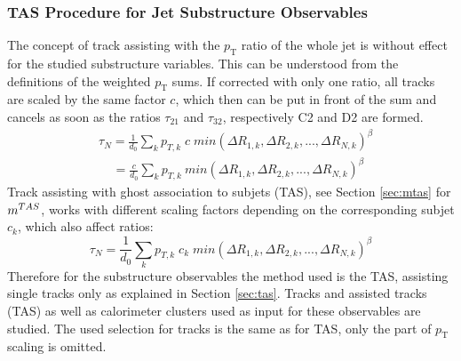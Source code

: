 \subsubsection{TAS Procedure for Jet Substructure Observables}
The concept of track assisting with the $p_{\mathrm{T}}$ ratio of the whole jet is without effect for the studied substructure variables. This can be understood from the definitions of the weighted $p_{\mathrm{T}}$ sums. If corrected with only one ratio, all tracks are scaled by the same factor $c$, which then can be put in front of the sum and cancels as soon as the ratios $\tau_{21}$ and $\tau_{32}$, respectively C2 and D2 are formed.
\begin{equation}
\begin{aligned}
 & \tau_N ={} \frac{1}{d_0}\sum_k p_{T,k} \; c \; min(\Delta R_{1,k},\Delta R_{2,k},...,\Delta R_{N,k})^{\beta} \\
 & \; \; \; \;  ={} \frac{c}{d_0}\sum_k p_{T,k}\:min(\Delta R_{1,k},\Delta R_{2,k},...,\Delta R_{N,k})^{\beta}
\end{aligned}
\end{equation}
Track assisting with ghost association to subjets (TAS), see Section \ref{sec:mtas} for $m^{TAS}$, works with different scaling factors depending on the corresponding subjet $c_k$, which also affect ratios:
\begin{equation}
\tau_N = \frac{1}{d_0}\sum_k p_{T,k} \; c_k \; min(\Delta R_{1,k},\Delta R_{2,k},...,\Delta R_{N,k})^{\beta} 
\end{equation}\label{eq:tas_ta}
Therefore for the substructure observables the method used is the TAS, assisting single tracks only as explained in Section \ref{sec:tas}. Tracks and assisted tracks (TAS) as well as calorimeter clusters used as input for these observables are studied. The used selection for tracks is the same as for TAS, only the part of $p_{\text{T}}$ scaling is omitted.